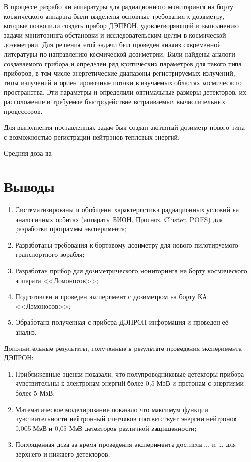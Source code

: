 
В процессе разработки аппаратуры для радиационного мониторинга на борту космического аппарата были выделены основные требования к дозиметру, которые позволили создать прибор ДЭПРОН, удовлетворяющий и выполнению задачи мониторинга обстановки и исследовательским целям в космической дозиметрии. Для решения этой задачи был проведен анализ современной литературы по направлению космической дозиметрии. Были найдены аналоги создаваемого прибора и определен ряд критических параметров для такого типа приборов, в том числе энергетические диапазоны регистрируемых излучений, типы излучений и ориентировочные потоки в изучаемых областях космического пространства. Эти параметры и определили оптимальные размеры детекторов, их расположение и требуемое быстродействие встраиваемых вычислительных процессоров.

Для выполнения поставленных задач был создан активный дозиметр нового типа с возможностью регистрации нейтронов тепловых энергий.

Средняя доза на 

\section{Выводы}
\begin{enumerate}
	\item Систематизированы и обобщены характеристики радиационных условий на аналогичных орбитах (аппараты БИОН, Прогноз, Cluster, POES) для разработки программы эксперимента;
	\item Разработаны требования к бортовому дозиметру для нового пилотируемого транспортного корабля;
	\item Разработан прибор для дозиметрического мониторинга на борту космического аппарата <<Ломоносов>>;
	\item Подготовлен и проведен эксперимент с дозиметром на борту КА <<Ломоносов>>;
	\item Обработана полученная с прибора ДЭПРОН информация и проведен её анализ.	
\end{enumerate}

Дополнительные результаты, полученные в результате проведения эксперимента ДЭПРОН: 
\begin{enumerate}

  \item Приближенные оценки показали, что полупроводниковые детекторы прибора чувствительны к электронам энергий более 0,5 МэВ и протонам с энергиями более 5 МэВ;
  \item Математическое моделирование показало что максимум функции чувствительности нейтронный счетчиков соответствует энергии нейтронов 0,005 МэВ и 0,05 МэВ детекторов различной защищенности;
  \item Поглощенная доза за время проведения эксперимента достигла ... и ... для верхнего и нижнего детекторов.
  
\end{enumerate}

